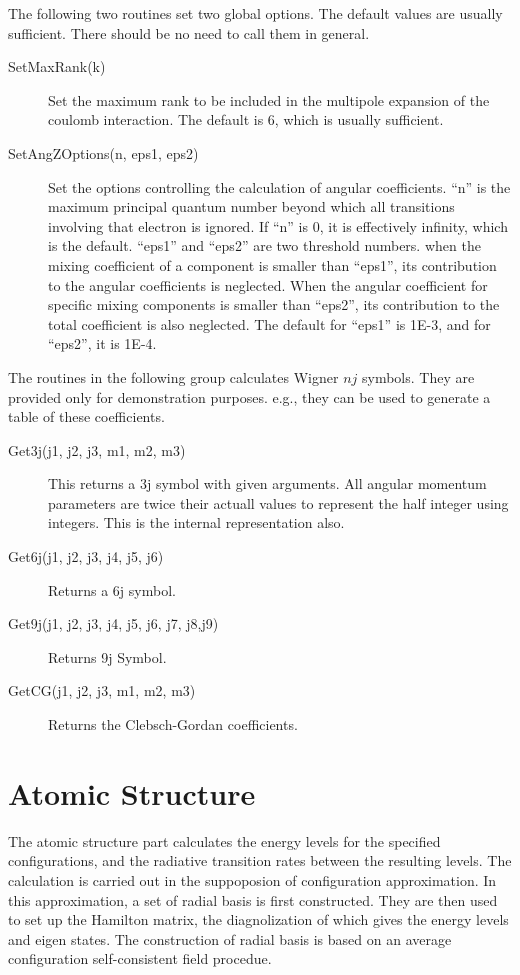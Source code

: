 \documentclass[12pt]{article}
\begin{document}
The following two routines set two global options. The default values are
usually sufficient. There should be no need to call them in general. 
\begin{description}
\item[SetMaxRank(k)] 
Set the maximum rank to be included in the multipole
expansion of the coulomb interaction. The default is 6, which is usually
sufficient. 

\item[SetAngZOptions(n, eps1, eps2)] 
Set the options controlling the
calculation of angular coefficients. ``n'' is the maximum principal quantum
number beyond which all transitions involving that electron is ignored. If
``n'' is 0, it is effectively infinity, which is the default. 
``eps1'' and ``eps2'' are two threshold numbers. when
the mixing coefficient of a component is smaller than ``eps1'', its
contribution to the angular coefficients is neglected. When the angular
coefficient for specific mixing components is smaller than ``eps2'', its
contribution to the total coefficient is also neglected. The default for
``eps1'' is 1E-3, and for ``eps2'', it is 1E-4. 

\end{description}

The routines in the following group calculates Wigner $nj$ symbols. They are
provided only for demonstration purposes. e.g., they can be used to generate a
table of these coefficients.
\begin{description}
\item[Get3j(j1, j2, j3, m1, m2, m3)] This returns a 3j symbol with given
arguments. All angular momentum parameters are twice their actuall values to
represent the half integer using integers. This is the internal
representation also. 

\item[Get6j(j1, j2, j3, j4, j5, j6)] Returns a 6j symbol.

\item[Get9j(j1, j2, j3, j4, j5, j6, j7, j8,j9)] Returns 9j Symbol.

\item[GetCG(j1, j2, j3, m1, m2, m3)] Returns the Clebsch-Gordan coefficients.

\end{description}


\section{Atomic Structure}
The atomic structure part calculates the energy levels for the specified
configurations, and the radiative transition rates between the resulting
levels. The calculation is carried out in the suppoposion of configuration
approximation. In this approximation, a set of radial basis is first
constructed. They are then used to set up the Hamilton matrix, the
diagnolization of which gives the energy levels and eigen states. The
construction of radial basis is based on an average configuration
self-consistent field procedue. 
\end{document}
